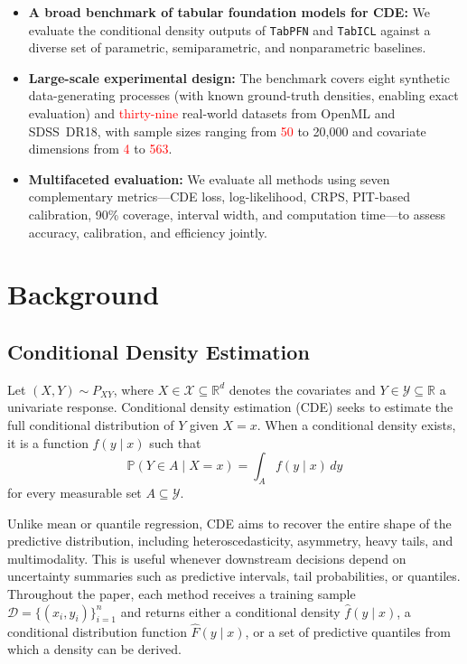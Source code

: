 \documentclass{article}
\newcommand{\method}[1]{\texttt{#1}}
\newcommand{\Prob}{\mathbb{P}}
\newcommand{\R}{\mathbb{R}}
\newcommand{\cX}{\mathcal{X}}
\newcommand{\cD}{\mathcal{D}}
\newcommand{\cY}{\mathcal{Y}}
\begin{document}
\begin{itemize}[leftmargin=*]
  \item \textbf{A broad benchmark of tabular foundation models for CDE:}
    We evaluate the conditional density outputs of \method{TabPFN} and
    \method{TabICL} against a diverse set of parametric, semiparametric,
    and nonparametric baselines.

  \item \textbf{Large-scale experimental design:}
    The benchmark covers eight synthetic data-generating processes (with
    known ground-truth densities, enabling exact evaluation) and
    \textcolor{red}{thirty-nine} real-world datasets from OpenML and SDSS~DR18, with sample
    sizes ranging from \textcolor{red}{50} to 20{,}000 and covariate dimensions from
    \textcolor{red}{4} to \textcolor{red}{563}.

  \item \textbf{Multifaceted evaluation:}
    We evaluate all methods using seven complementary metrics---CDE loss,
    log-likelihood, CRPS, PIT-based calibration, 90\% coverage, interval
    width, and computation time---to assess accuracy, calibration, and
    efficiency jointly.
\end{itemize}



\section{Background}
\label{sec:background}

\subsection{Conditional Density Estimation}
\label{sec:cde_background}

Let $(X,Y)\sim P_{XY}$, where $X\in\cX\subseteq\R^d$ denotes the covariates and
$Y\in\cY\subseteq\R$ a univariate response. Conditional density estimation
(CDE) seeks to estimate the full conditional distribution of $Y$ given $X=x$.
When a conditional density exists, it is a function $f(y\mid x)$ such that
\begin{equation}
  \Prob(Y\in A\mid X=x)=\int_A f(y\mid x)\,dy
  \label{eq:cond_density}
\end{equation}
for every measurable set $A\subseteq\cY$.

Unlike mean or quantile regression, CDE aims to recover the entire shape of the
predictive distribution, including heteroscedasticity, asymmetry, heavy tails,
and multimodality. This is useful whenever downstream decisions depend on
uncertainty summaries such as predictive intervals, tail probabilities, or
quantiles. Throughout the paper, each method receives a training sample
$\cD=\{(x_i,y_i)\}_{i=1}^n$ and returns either a conditional density
$\hat f(y\mid x)$, a conditional distribution function $\hat F(y\mid x)$, or a
set of predictive quantiles from which a density can be derived.
\end{document}
